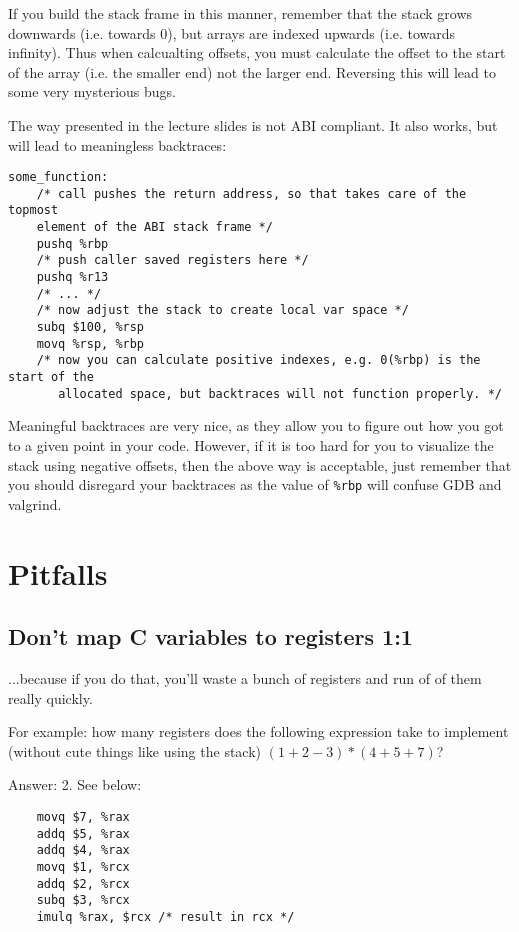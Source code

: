 \documentclass[11pt]{article}
\begin{document}
If you build the stack frame in this manner, remember that the stack grows downwards (i.e.
towards 0), but arrays are indexed upwards (i.e. towards infinity). Thus when calcualting
offsets, you must calculate the offset to the start of the array (i.e. the smaller end)
not the larger end. Reversing this will lead to some very mysterious bugs.

The way presented in the lecture slides is not ABI compliant. It also works, but will lead
to meaningless backtraces:

\begin{lstlisting}
some_function:
    /* call pushes the return address, so that takes care of the topmost
    element of the ABI stack frame */
    pushq %rbp
    /* push caller saved registers here */
    pushq %r13
    /* ... */
    /* now adjust the stack to create local var space */
    subq $100, %rsp
    movq %rsp, %rbp
    /* now you can calculate positive indexes, e.g. 0(%rbp) is the start of the
       allocated space, but backtraces will not function properly. */
\end{lstlisting}

Meaningful backtraces are very nice, as they allow you to figure out how you got to a
given point in your code. However, if it is too hard for you to visualize the stack using
negative offsets, then the above way is acceptable, just remember that you should
disregard your backtraces as the value of \texttt{\%rbp} will confuse GDB and valgrind.

\section{Pitfalls}

\subsection{Don't map C variables to registers 1:1}

...because if you do that, you'll waste a bunch of registers and run of of them really
quickly.

For example: how many registers does the following expression take to implement (without
cute things like using the stack) $(1+2-3)*(4+5+7)$?

Answer: 2. See below:

\begin{lstlisting}
    movq $7, %rax
    addq $5, %rax
    addq $4, %rax
    movq $1, %rcx
    addq $2, %rcx
    subq $3, %rcx
    imulq %rax, $rcx /* result in rcx */
\end{lstlisting}
\end{document}
